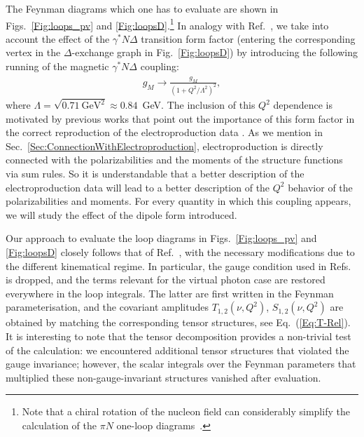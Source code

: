 \documentclass[twocolumn,prc,showpacs,nofootinbib,preprintnumbers,amsmath,amssymb,superscriptaddress]{revtex4-1}
\def\eqlab#1{\label{eq:#1}}
\begin{document}
The Feynman diagrams which one has to evaluate are shown in Figs.~\ref{Fig:loops_pv} and \ref{Fig:loopsD}.\footnote{Note that a chiral rotation of the nucleon field can considerably simplify the calculation of the $\pi N$ one-loop diagrams~\cite{Lensky:2009uv}.}
 In analogy with Ref.~\cite{Pascalutsa:2005vq}, we take into account the effect of the $\gamma^* N \Delta$ transition form factor
(entering the corresponding vertex in the $\Delta$-exchange graph in Fig.~\ref{Fig:loopsD}) by introducing the following running
of the magnetic $\gamma^* N \Delta$ coupling:
\begin{align}
g_M \to \frac{g_M}{(1+ Q^2/\Lambda^2 )^2 },\eqlab{dipolegm}
\end{align} 
where $\Lambda=\sqrt{0.71~\text{GeV}^2}\approx 0.84$~GeV. 
The inclusion of this $Q^2$ dependence is motivated by previous works that point out the importance of this form factor in the correct reproduction of the electroproduction data \cite{Pascalutsa:2005vq}. 
As we mention in Sec.~\ref{Sec:ConnectionWithElectroproduction}, electroproduction is directly connected with the polarizabilities and the moments of the structure functions via sum rules. 
 So it is understandable that a better description of the electroproduction data will lead to a better description of the $Q^2$ behavior of the polarizabilities and moments.
  For every quantity in which this coupling appears, we will study the effect of the dipole form introduced. 
 
 


Our approach to evaluate the loop diagrams in Figs.~\ref{Fig:loops_pv} and \ref{Fig:loopsD} closely follows that of Ref.~\cite{Lensky:2009uv},
with the necessary modifications due to the different kinematical regime. In particular, the gauge condition used in Refs.~\cite{Pascalutsa:2002pi,Lensky:2009uv}
is dropped, and the terms relevant for the virtual photon case are restored everywhere in the loop integrals.
The latter are first written in the Feynman parameterisation, and the covariant amplitudes $T_{1,2}(\nu,Q^2)$, $S_{1,2}(\nu,Q^2)$
are obtained by matching the corresponding tensor structures, see Eq.~(\ref{Eq:T-Rel}).
It is interesting to note that the tensor decomposition provides a non-trivial test of the calculation: we encountered additional tensor structures
that violated the gauge invariance; however, the scalar integrals over the Feynman parameters that multiplied these non-gauge-invariant structures
vanished after evaluation.
\end{document}
